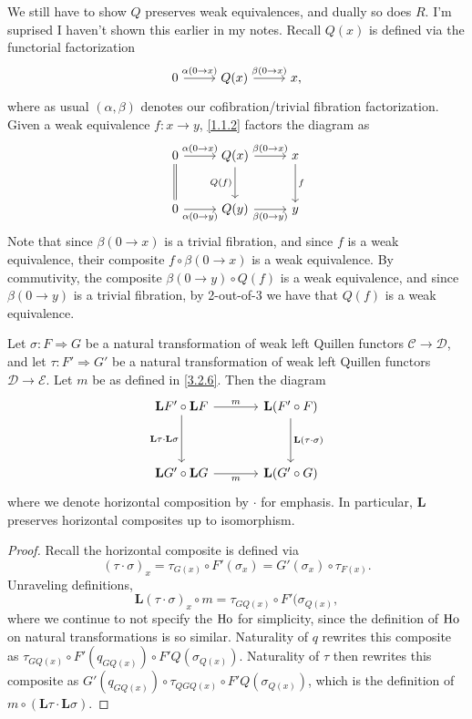\begin{remark}\label{3.2.7}
	We still have to show $Q$ preserves weak equivalences, and dually so does $R$. I'm suprised I haven't shown this earlier in my notes. Recall $Q(x)$ is defined via the functorial factorization
	\[\begin{tikzcd}[row sep = 2.5em, column sep = 2.5em]
	0 \ar[" \alpha(0\to x) ", r]  & Q(x)\ar[" \beta(0\to x) ", r]  & x,
	\end{tikzcd}\]
	where as usual $(\alpha,\beta)$ denotes our cofibration/trivial fibration factorization. Given a weak equivalence $f:x\to y$, \cref{1.1.2} factors the diagram as
	\[\begin{tikzcd}[row sep = 2.5em, column sep = 2.5em]
	0 \ar[equals, d] \ar[" \alpha(0\to x) ", r]  & Q(x) \ar[" Q(f) "', d] \ar[" \beta(0\to x) ", r] & x\ar[" f ", d]  \\
	0 \ar[" \alpha(0\to y) "', r]  & Q(y)\ar[" \beta(0\to y) "', r]  & y
	\end{tikzcd}\]
	Note that since $\beta(0\to x)$ is a trivial fibration, and since $f$ is a weak equivalence, their composite $f\circ \beta(0\to x)$ is a weak equivalence. By commutivity, the composite $\beta(0\to y)\circ Q(f)$ is a weak equivalence, and since $\beta(0\to y)$ is a trivial fibration, by 2-out-of-3 we have that $Q(f)$ is a weak equivalence.
\end{remark}

\begin{lemma}\label{3.2.8}
	Let $\sigma : F \Rightarrow G $ be a natural transformation of weak left Quillen functors $\mathcal{C} \to \mathcal{D} $, and let $\tau : F' \Rightarrow G'$ be a natural transformation of weak left Quillen functors $\mathcal{D} \to \mathcal{E} $. Let $m$ be as defined in \cref{3.2.6}. Then the diagram
	\[\begin{tikzcd}[row sep = 3.5em, column sep = 3.5em]
	\mathbf{L} F' \circ \mathbf{L} F\ar[" m ", r] \ar[" \mathbf{L} \tau \cdot \mathbf{L} \sigma "', d]  & \mathbf{L} (F'\circ F)\ar[" \mathbf{L} (\tau\cdot \sigma) ", d]  \\
	\mathbf{L} G'\circ \mathbf{L} G \ar[" m "', r]  & \mathbf{L} (G'\circ G)
	\end{tikzcd}\]
	where we denote horizontal composition by $\cdot $ for emphasis. In particular, $\mathbf{L} $ preserves horizontal composites up to isomorphism.
\end{lemma}
\begin{proof}
	Recall the horizontal composite is defined via
	\[
		(\tau\cdot \sigma)_x=\tau_{G(x)} \circ F'(\sigma_x)=G'(\sigma_x)\circ \tau_{F(x)} 
	.\]
	Unraveling definitions,
	\[
		\mathbf{L} (\tau\cdot \sigma)_x\circ m=\tau_{GQ(x)} \circ F'(\sigma_{Q(x)} ,
	\]
	where we continue to not specify the $\operatorname{Ho} $ for simplicity, since the definition of $\operatorname{Ho} $ on natural transformations is so similar. Naturality of $q$ rewrites this composite as $\tau_{GQ(x)} \circ F'(q_{GQ(x)} )\circ F'Q(\sigma_{Q(x)} )$. Naturality of $\tau$ then rewrites this composite as $G'(q_{GQ(x)} )\circ \tau_{QGQ(x)} \circ F'Q(\sigma_{Q(x)} )$, which is the definition of $m\circ (\mathbf{L} \tau \cdot \mathbf{L} \sigma)$.
\end{proof}


